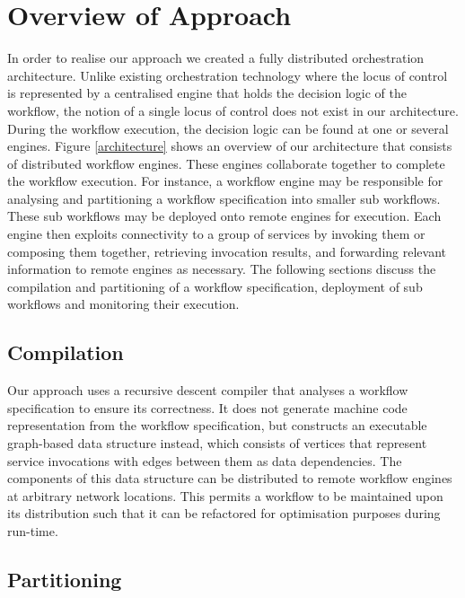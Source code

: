 \documentclass[10pt, conference, compsocconf]{IEEEtran}
\begin{document}
\section{Overview of Approach}\label{WorkflowPartitioning}

In order to realise our approach we created a fully distributed orchestration architecture.
Unlike existing orchestration technology where the locus of control is represented by a centralised engine that holds the decision logic of the workflow, the notion of a single locus of control does not exist in our architecture.
During the workflow execution, the decision logic can be found at one or several engines.
Figure \ref{architecture} shows an overview of our architecture that consists of distributed workflow engines.
These engines collaborate together to complete the workflow execution.
For instance, a workflow engine may be responsible for analysing and partitioning a workflow specification into smaller sub workflows.
These sub workflows may be deployed onto remote engines for execution.
Each engine then exploits connectivity to a group of services by invoking them or composing them together, retrieving invocation results, and forwarding relevant information to remote engines as necessary.
The following sections discuss the compilation and partitioning of a workflow specification, deployment of sub workflows and monitoring their execution.

\subsection{Compilation}

Our approach uses a recursive descent compiler that analyses a workflow specification to ensure its correctness.
It does not generate machine code representation from the workflow specification, but constructs an executable graph-based data structure instead, which consists of vertices that represent service invocations with edges between them as data dependencies.
The components of this data structure can be distributed to remote workflow engines at arbitrary network locations.
This permits a workflow to be maintained upon its distribution such that it can be refactored for optimisation purposes during run-time.

\subsection{Partitioning}\label{PartitioningSection}
\end{document}
